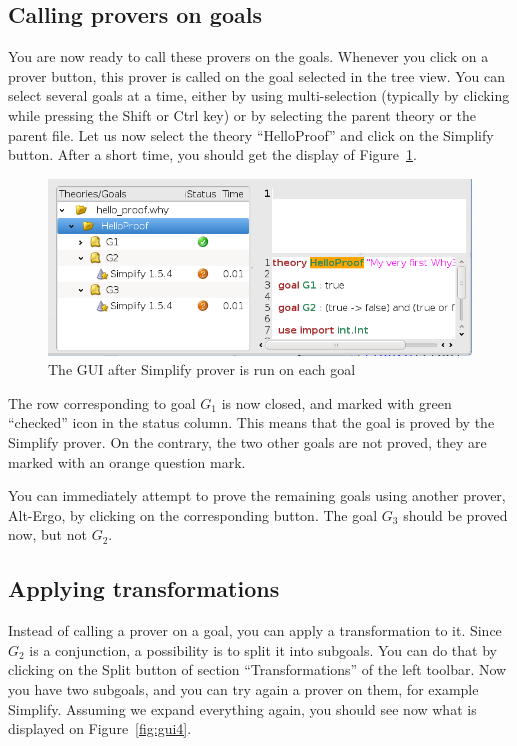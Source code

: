 \subsection{Calling provers on goals}

You are now ready to call these provers on the goals. Whenever you
click on a prover button, this prover is called on the goal selected
in the tree view. You can select several goals at a time, either
by using multi-selection (typically by clicking while pressing the
\textsf{Shift} or \textsf{Ctrl} key) or by selecting the parent theory
or the parent file. Let us now select the theory ``HelloProof'' and
click on the \textsf{Simplify} button. After a short time, you should
get the display of Figure~\ref{fig:gui3}.

\begin{figure}[tbp]
  \includegraphics[width=\textwidth]{gui3.png}
  \caption{The GUI after Simplify prover is run on each goal}
  \label{fig:gui3}
\end{figure}

The row corresponding to goal $G_1$ is now closed, and marked with
green ``checked'' icon in the status column. This means that the goal
is proved by the Simplify prover. On the contrary, the two other goals
are not proved, they are marked with an orange question mark.

You can immediately attempt to prove the remaining goals using another
prover, {\eg} Alt-Ergo, by clicking on the corresponding button. The
goal $G_3$ should be proved now, but not $G_2$. 

\subsection{Applying transformations}

Instead of calling a prover on a goal, you can apply a transformation
to it.  Since $G_2$ is a conjunction, a possibility is to split it
into subgoals. You can do that by clicking on the \textsf{Split}
button of section ``Transformations'' of the left toolbar. Now you
have two subgoals, and you can try again a prover on them, for example
Simplify. Assuming we expand everything again, you should see now what
is displayed on Figure~\ref{fig:gui4}.

